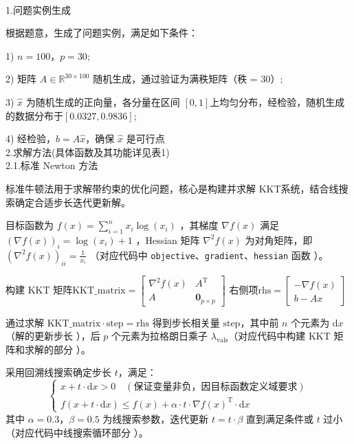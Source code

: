 \documentclass{article}
\newenvironment{solution_cn}{%
  \begin{proof}[解答]%
  \kaishu  %
}{%
  \end{proof}%
}
\begin{document}
\begin{solution_cn}
\quad \\1.问题实例生成

根据题意，生成了问题实例，满足如下条件：

1) \(n = 100\)，\(p = 30\);

2) 矩阵 \(A \in \mathbb{R}^{30 \times 100}\) 随机生成，通过验证为满秩矩阵（秩 = 30）;

3) \(\hat{x}\) 为随机生成的正向量，各分量在区间 \([0,1]\)上均匀分布，经检验，随机生成的数据分布于\([0.0327,0.9836]\);

4) 经检验，\(b = A\hat{x}\)，确保 \(\hat{x}\) 是可行点\\
2.求解方法(具体函数及其功能详见表1)\\
2.1.标准 Newton 方法

标准牛顿法用于求解带约束的优化问题，核心是构建并求解 KKT系统，结合线搜索确定合适步长迭代更新解。

目标函数为 \( f(x) = \sum_{i = 1}^{n} x_i \log(x_i) \) ，其梯度 \( \nabla f(x) \) 满足 \( (\nabla f(x))_i = \log(x_i) + 1 \) ，Hessian 矩阵 \( \nabla^2 f(x) \) 为对角矩阵，即 \( (\nabla^2 f(x))_{ii} = \frac{1}{x_i} \) （对应代码中 \texttt{objective}、\texttt{gradient}、\texttt{hessian} 函数 ）。

构建 KKT 矩阵$\text{KKT\_matrix} = \begin{bmatrix} 
\nabla^2 f(x) & A^{\mathrm{T}} \\
A & \mathbf{0}_{p \times p} 
\end{bmatrix}$
右侧项$\text{rhs} = \begin{bmatrix} -\nabla f(x) \\ b - A x \end{bmatrix}$

通过求解 \( \text{KKT\_matrix} \cdot \text{step} = \text{rhs} \) 得到步长相关量 \( \text{step} \)，其中前 \( n \) 个元素为 \( \mathrm{d}x \)（解的更新步长 ），后 \( p \) 个元素为拉格朗日乘子 \( \lambda_{\text{vals}} \)（对应代码中构建 KKT 矩阵和求解的部分 ）。

采用回溯线搜索确定步长 \( t \)，满足：
\[
\begin{cases} 
x + t \cdot \mathrm{d}x > 0 \quad (\text{保证变量非负，因目标函数定义域要求}) \\
f(x + t \cdot \mathrm{d}x) \leq f(x) + \alpha \cdot t \cdot \nabla f(x)^{\mathrm{T}} \cdot \mathrm{d}x 
\end{cases}
\]
其中 \( \alpha = 0.3 \)，\( \beta = 0.5 \) 为线搜索参数，迭代更新 \( t = t \cdot \beta \) 直到满足条件或 \( t \) 过小（对应代码中线搜索循环部分 ）。


\end{solution_cn}
\end{document}
